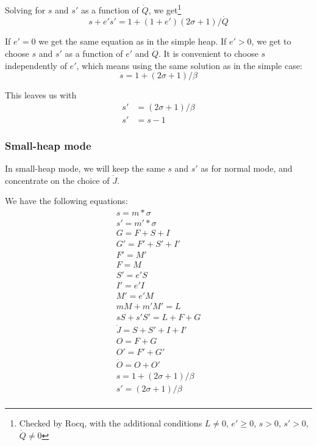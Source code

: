 \documentclass{article}
\begin{document}
Solving for $s$ and $s'$ as a function of $\dot{Q}$, we get\footnote{
Checked by Rocq, with the additional conditions
$L \neq 0$,
$e' \ge 0$,
$s > 0$,
$s' > 0$,
$\dot{Q} \neq 0$
}
\begin{equation} \label{eqn-s'}
s + e' s' = 1 + (1+e') (2\sigma+1)/\dot{Q}
\end{equation}

If $e' = 0$ we get the same equation as in the simple heap. If $e' >
0$, we get to choose $s$ and $s'$ as a function of $e'$ and
$\dot{Q}$. It is convenient to choose $s$ independently of $e'$,
which means using the same solution as in the simple case:
\begin{equation} \label{solution-s'}
s = 1 + (2\sigma+1)/\beta
\end{equation}

This leaves us with
\begin{align}
s' & = (2\sigma+1)/\beta \\
s' & = s - 1
\end{align}


\subsubsection{Small-heap mode}

In small-heap mode, we will keep the same $s$ and $s'$ as for normal
mode, and concentrate on the choice of $\dot{J}$.

We have the following equations:
\begin{gather*}
s = m * \sigma \\
s' = m' * \sigma \\
G = F + S + I  \\
G' = F' + S' + I'  \\
F' = M'  \\
F = M \\
S' = e'S \\
I' = e'I \\
M' = e'M \\
mM + m'M' = L \\
sS + s'S' = L + F + G \\
\dot{J} = S + S' + I + I'  \\
O = F + G  \\
O' = F' + G' \\
\dot{O} = O + O'  \\
s = 1 + (2\sigma+1)/\beta \\
s' = (2\sigma+1)/\beta \\
\end{gather*}
\end{document}
